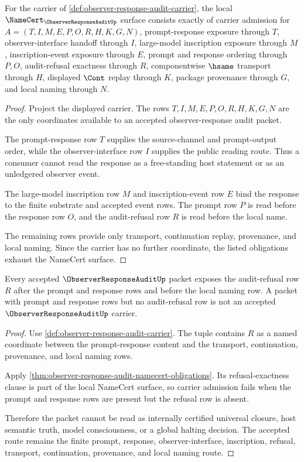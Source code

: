 \begin{theorem}
\label{thm:observer-response-audit-namecert-obligations}
For the carrier of \autoref{def:observer-response-audit-carrier}, the local $\NameCert_{\ObserverResponseAuditUp}$ surface consists exactly of carrier admission for $A=(T,I,M,E,P,O,R,H,K,G,N)$, prompt-response exposure through $T$, observer-interface handoff through $I$, large-model inscription exposure through $M$, inscription-event exposure through $E$, prompt and response ordering through $P,O$, audit-refusal exactness through $R$, componentwise $\hsame$ transport through $H$, displayed $\Cont$ replay through $K$, package provenance through $G$, and local naming through $N$.
\end{theorem}
\begin{proof}
Project the displayed carrier. The rows $T,I,M,E,P,O,R,H,K,G,N$ are the only coordinates available to an accepted observer-response audit packet.

The prompt-response row $T$ supplies the source-channel and prompt-output order, while the observer-interface row $I$ supplies the public reading route. Thus a consumer cannot read the response as a free-standing host statement or as an unledgered observer event.

The large-model inscription row $M$ and inscription-event row $E$ bind the response to the finite substrate and accepted event rows. The prompt row $P$ is read before the response row $O$, and the audit-refusal row $R$ is read before the local name.

The remaining rows provide only transport, continuation replay, provenance, and local naming. Since the carrier has no further coordinate, the listed obligations exhaust the NameCert surface.
\end{proof}

\begin{theorem}
\label{thm:observer-response-audit-refusal-boundary}
Every accepted $\ObserverResponseAuditUp$ packet exposes the audit-refusal row $R$ after the prompt and response rows and before the local naming row. A packet with prompt and response rows but no audit-refusal row is not an accepted $\ObserverResponseAuditUp$ carrier.
\end{theorem}
\begin{proof}
Use \autoref{def:observer-response-audit-carrier}. The tuple contains $R$ as a named coordinate between the prompt-response content and the transport, continuation, provenance, and local naming rows.

Apply \autoref{thm:observer-response-audit-namecert-obligations}. Its refusal-exactness clause is part of the local NameCert surface, so carrier admission fails when the prompt and response rows are present but the refusal row is absent.

Therefore the packet cannot be read as internally certified universal closure, host semantic truth, model consciousness, or a global halting decision. The accepted route remains the finite prompt, response, observer-interface, inscription, refusal, transport, continuation, provenance, and local naming route.
\end{proof}

